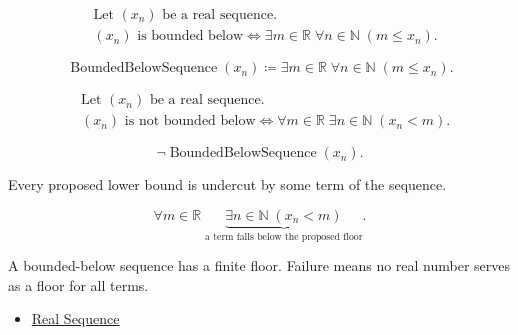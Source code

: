 \begin{remark*}
\[
\begin{aligned}
&\text{Let } (x_n) \text{ be a real sequence.}\\
&(x_n) \text{ is bounded below}
\Longleftrightarrow
\exists m \in \mathbb{R}\;
\forall n \in \mathbb{N}\;(m \le x_n).
\end{aligned}
\]
\end{remark*}

\begin{remark*}
\[
\operatorname{BoundedBelowSequence}(x_n)
\coloneqq
\exists m \in \mathbb{R}\;
\forall n \in \mathbb{N}\;(m \le x_n).
\]
\end{remark*}

\begin{remark*}
\[
\begin{aligned}
&\text{Let } (x_n) \text{ be a real sequence.}\\
&(x_n) \text{ is not bounded below}
\Longleftrightarrow
\forall m \in \mathbb{R}\;
\exists n \in \mathbb{N}\;(x_n < m).
\end{aligned}
\]
\end{remark*}

\begin{remark*}
\[
\neg\operatorname{BoundedBelowSequence}(x_n).
\]
\end{remark*}

\begin{remark*}
Every proposed lower bound is undercut by some term of the sequence.
\end{remark*}

\begin{remark*}
\[
\forall m \in \mathbb{R}\;
\underbrace{\exists n \in \mathbb{N}\;(x_n < m)}
_{\text{a term falls below the proposed floor}}.
\]
\end{remark*}

\begin{remark*}[Interpretation]
A bounded-below sequence has a finite floor. Failure means no real number
serves as a floor for all terms.
\end{remark*}

\begin{dependencies}
\begin{itemize}
  \item \hyperref[def:real-sequence]{Real Sequence}
\end{itemize}
\end{dependencies}

